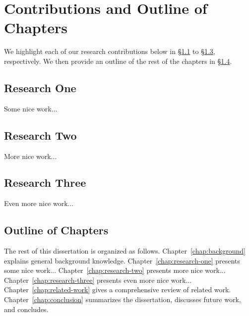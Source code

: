 \section{Contributions and Outline of Chapters}
\label{sec:intro:overview}

We highlight each of our research contributions below in \S\ref{subsec:intro:overview-one} to \S\ref{subsec:intro:overview-three}, respectively. We then provide an outline of the rest of the chapters in \S\ref{subsec:intro:overview-chapters}.


\subsection{Research One}
\label{subsec:intro:overview-one}

Some nice work...


\subsection{Research Two}
\label{subsec:intro:overview-two}

More nice work...


\subsection{Research Three}
\label{subsec:intro:overview-three}

Even more nice work...


\subsection{Outline of Chapters}
\label{subsec:intro:overview-chapters}

The rest of this dissertation is organized as follows. Chapter~\ref{chap:background} explains general background knowledge. Chapter~\ref{chap:research-one} presents some nice work... Chapter~\ref{chap:research-two} presents more nice work... Chapter~\ref{chap:research-three} presents even more nice work... Chapter~\ref{chap:related-work} gives a comprehensive review of related work. Chapter~\ref{chap:conclusion} summarizes the dissertation, discusses future work, and concludes.
